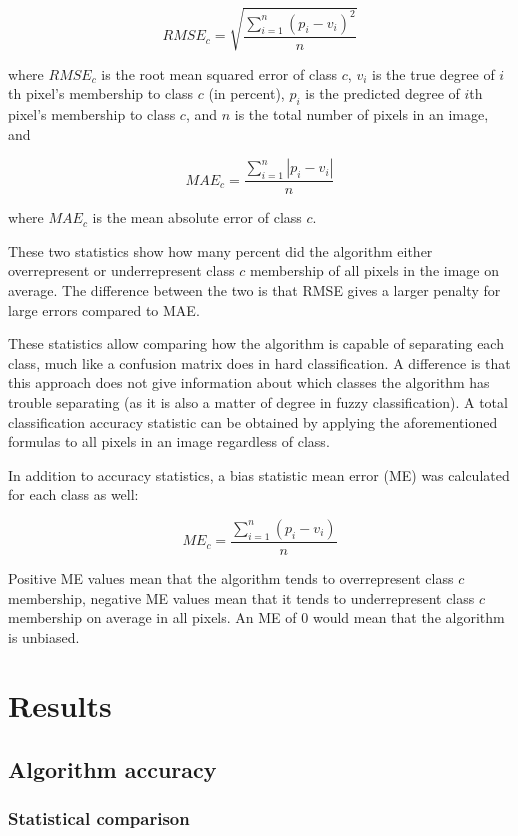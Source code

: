 \documentclass[a4paper,10pt]{book}
\begin{document}
$$ RMSE_c = \sqrt{ \frac{\displaystyle\sum_{i=1}^{n}{ (p_{i} - v_{i})^2 }}{n} } $$

where $ RMSE_c $ is the root mean squared error of class $ c $, $ v_{i} $ is the true degree of $ i $th pixel's membership to class $ c $ (in percent), $ p_i $ is the predicted degree of $ i $th pixel's membership to class $ c $, and $ n $ is the total number of pixels in an image, and

$$ MAE_c = \frac{\displaystyle\sum_{i=1}^{n}{ |p_{i} - v_{i}| }}{n} $$

where $ MAE_c $ is the mean absolute error of class $ c $.

These two statistics show how many percent did the algorithm either overrepresent or underrepresent class $ c $ membership of all pixels in the image on average. The difference between the two is that RMSE gives a larger penalty for large errors compared to MAE.

These statistics allow comparing how the algorithm is capable of separating each class, much like a confusion matrix does in hard classification. A difference is that this approach does not give information about which classes the algorithm has trouble separating (as it is also a matter of degree in fuzzy classification). A total classification accuracy statistic can be obtained by applying the aforementioned formulas to all pixels in an image regardless of class.

In addition to accuracy statistics, a bias statistic mean error (ME) was calculated for each class as well:

$$ ME_c = \frac{\displaystyle\sum_{i=1}^{n}{ (p_{i} - v_{i}) }}{n} $$

Positive ME values mean that the algorithm tends to overrepresent class $c$ membership, negative ME values mean that it tends to underrepresent class $c$ membership on average in all pixels. An ME of 0 would mean that the algorithm is unbiased.

\chapter{Results}

\section{Algorithm accuracy}

\subsection{Statistical comparison}
\end{document}
